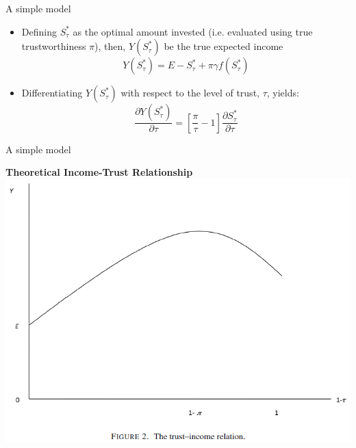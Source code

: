 \documentclass[pdftex,12pt,xcolor=pdftex,table]{beamer}
\begin{document}
\begin{frame}{A simple model}
    \begin{itemize}
        \item Defining $S_\tau^*$ as the optimal amount invested (i.e. evaluated using true trustworthiness $\pi$), then, $Y(S_\tau^*)$ be the true expected income \pause
    \begin{equation*}
        Y(S_\tau^*)=E-S_\tau^* +\pi \gamma f(S_\tau^*) 
    \end{equation*}
    \item Differentiating $Y(S_\tau^*)$ with respect to the level of trust, $\tau$, yields:
    \begin{equation*}
\frac{\partial Y(S_\tau^*)}{\partial \tau} = \left[\frac{\pi}{\tau} -1\right]\frac{\partial S_\tau^*}{\partial \tau}
\end{equation*}    
    \end{itemize}
\end{frame}

\begin{frame}{A simple model}
    \begin{center}
        \textbf{Theoretical Income-Trust Relationship}
        \includegraphics[scale=0.52]{figure_2.PNG}
    \end{center}
\end{frame}
\end{document}
